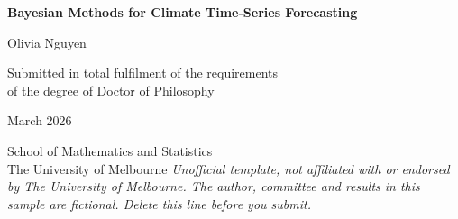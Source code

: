 \begin{titlepage}
\centering
\vspace*{1.2in}
{\LARGE\bfseries Bayesian Methods for Climate Time-Series Forecasting\par}
\vspace{0.8in}
{\large Olivia Nguyen\par}
\vspace{1in}
Submitted in total fulfilment of the requirements\\
of the degree of Doctor of Philosophy\par
\vspace{0.5in}
March 2026\par
\vspace{0.4in}
School of Mathematics and Statistics\\
The University of Melbourne
\vfill
{\footnotesize\itshape Unofficial template, not affiliated with or endorsed by The University of Melbourne. The author, committee and results in this sample are fictional. Delete this line before you submit.}
\end{titlepage}
